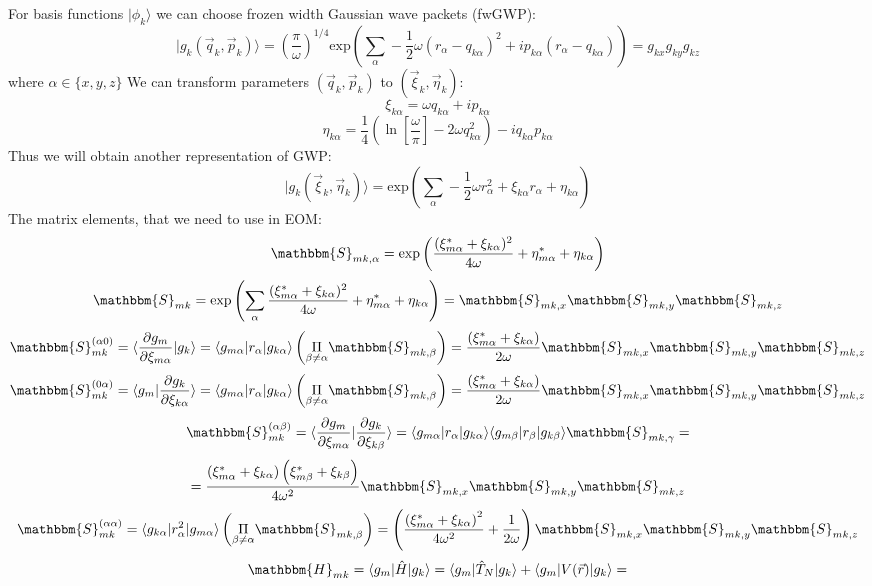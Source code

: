 For basis functions $|\phi_k\rangle$ we can choose frozen width Gaussian wave packets (fwGWP):
$$|g_k(\vec{q}_{k},\vec{p}_{k})\rangle = \left(\frac{\pi}{\omega}\right)^{1/4} \text{exp}\left(\sum_{\alpha}-\frac{1}{2}\omega(r_{\alpha}-q_{k\alpha})^2+%
									 ip_{k\alpha}(r_{\alpha}-q_{k\alpha})\right)=g_{kx}g_{ky}g_{kz}$$
where $\alpha \in \{x,y,z\}$
We can transform parameters $(\vec{q}_k,\vec{p}_k)$ to $(\vec{\xi}_k,\vec{\eta}_k)$:
$$\xi_{k\alpha} = \omega q_{k\alpha}+i p_{k\alpha}$$
$$\eta_{k\alpha} = \frac{1}{4}\left(\ln\left[{\frac{\omega}{\pi}}\right]-2\omega q_{k\alpha}^2\right)-iq_{k\alpha}p_{k\alpha}$$
Thus we will obtain another representation of GWP:
$$|g_k(\vec{\xi}_k,\vec{\eta}_k)\rangle=\text{exp}\left(\sum_{\alpha}-\frac{1}{2}\omega r_{\alpha}^2+\xi_{k\alpha}r_{\alpha}+\eta_{k\alpha}\right)$$
The matrix elements, that we need to use in EOM:
$$\mathbbm{S}_{mk,\alpha}=\text{exp}\left(\frac{(\xi_{m\alpha}^*+\xi_{k\alpha})^2}{4\omega}+\eta_{m\alpha}^*+\eta_{k\alpha} \right)$$
$$\mathbbm{S}_{mk} = \text{exp}\left(\sum_{\alpha} \frac{(\xi_{m\alpha}^*+\xi_{k\alpha})^2}{4\omega}+\eta_{m\alpha}^*+\eta_{k\alpha}\right)=%
  \mathbbm{S}_{mk,x}\mathbbm{S}_{mk,y}\mathbbm{S}_{mk,z}$$
$$\mathbbm{S}_{mk}^{(\alpha0)}=\langle\frac{\partial g_m}{\partial\xi_{m\alpha}}|g_k\rangle=%
  \langle g_{m\alpha}|r_{\alpha}|g_{k\alpha}\rangle\left(\underset{\beta\neq\alpha}{\Pi}\mathbbm{S}_{mk,\beta}\right)=%
  \frac{\left(\xi_{m\alpha}^*+\xi_{k\alpha}\right)}{2\omega}\mathbbm{S}_{mk,x}\mathbbm{S}_{mk,y}\mathbbm{S}_{mk,z}$$
$$\mathbbm{S}_{mk}^{(0\alpha)}=\langle g_m|\frac{\partial g_k}{\partial\xi_{k\alpha}}\rangle=%
  \langle g_{m\alpha}|r_{\alpha}|g_{k\alpha}\rangle\left(\underset{\beta\neq\alpha}{\Pi}\mathbbm{S}_{mk,\beta}\right)=%
  \frac{\left(\xi_{m\alpha}^*+\xi_{k\alpha}\right)}{2\omega}\mathbbm{S}_{mk,x}\mathbbm{S}_{mk,y}\mathbbm{S}_{mk,z}$$
$$\mathbbm{S}_{mk}^{(\alpha\beta)}=\langle\frac{\partial g_m}{\partial\xi_{m\alpha}}|\frac{\partial g_k}{\partial\xi_{k\beta}}\rangle=%
  \langle g_{m\alpha}|r_{\alpha}|g_{k\alpha}\rangle\langle g_{m\beta}|r_{\beta}|g_{k\beta}\rangle\mathbbm{S}_{mk,\gamma}=$$
$$=\frac{\left(\xi_{m\alpha}^*+\xi_{k\alpha}\right)\left(\xi_{m\beta}^*+\xi_{k\beta}\right)}{4\omega^2}\mathbbm{S}_{mk,x}\mathbbm{S}_{mk,y}\mathbbm{S}_{mk,z}$$
$$\mathbbm{S}_{mk}^{(\alpha\alpha)}=\langle g_{k\alpha}|r_{\alpha}^2|g_{m\alpha}\rangle\left(\underset{\beta\neq\alpha}{\Pi}\mathbbm{S}_{mk,\beta}\right)=%
  \left(\frac{\left(\xi_{m\alpha}^*+\xi_{k\alpha}\right)^2}{4\omega^2}+\frac{1}{2\omega}\right)\mathbbm{S}_{mk,x}\mathbbm{S}_{mk,y}\mathbbm{S}_{mk,z}$$
$$\mathbbm{H}_{mk}=\langle g_m|\hat{H}|g_k\rangle=\langle g_m|\hat{T}_N|g_k\rangle+\langle g_m|V(\vec{r})|g_k\rangle=$$
